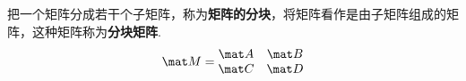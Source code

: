 

把一个矩阵分成若干个子矩阵，称为\textbf{矩阵的分块}，将矩阵看作是由子矩阵组成的矩阵，这种矩阵称为\textbf{分块矩阵}.
\[\mat M=\begin{matrix}
\mat A & \mat B\\
\mat C & \mat D
\end{matrix}\]